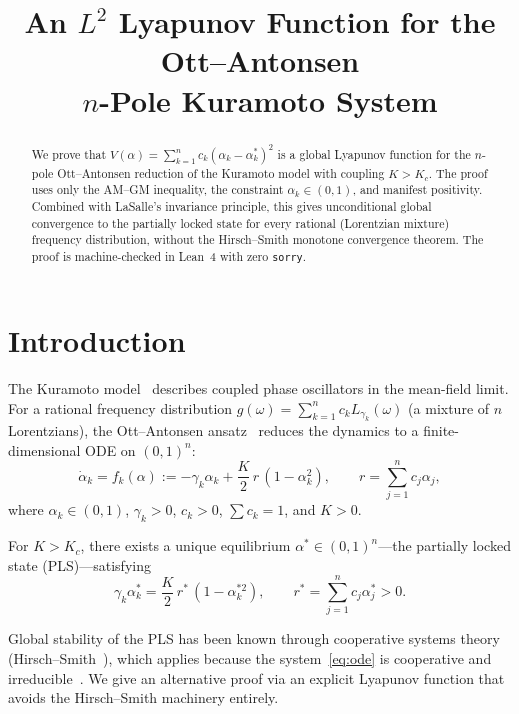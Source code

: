 \documentclass[11pt,a4paper]{article}
\title{An $L^2$ Lyapunov Function for the Ott--Antonsen\\$n$-Pole Kuramoto System}
\author{}
\date{}
\theoremstyle{definition}
\begin{document}
\maketitle

\begin{abstract}
We prove that $V(\alpha) = \sum_{k=1}^n c_k(\alpha_k - \alpha_k^*)^2$ is a global Lyapunov function for the $n$-pole Ott--Antonsen reduction of the Kuramoto model with coupling $K > K_c$. The proof uses only the AM--GM inequality, the constraint $\alpha_k \in (0,1)$, and manifest positivity. Combined with LaSalle's invariance principle, this gives unconditional global convergence to the partially locked state for every rational (Lorentzian mixture) frequency distribution, without the Hirsch--Smith monotone convergence theorem. The proof is machine-checked in Lean~4 with zero \texttt{sorry}.
\end{abstract}

\section{Introduction}

The Kuramoto model~\cite{kuramoto1975} describes coupled phase oscillators in the mean-field limit. For a rational frequency distribution $g(\omega) = \sum_{k=1}^n c_k L_{\gamma_k}(\omega)$ (a mixture of $n$ Lorentzians), the Ott--Antonsen ansatz~\cite{ott-antonsen2008} reduces the dynamics to a finite-dimensional ODE on $(0,1)^n$:
\begin{equation}\label{eq:ode}
\dot{\alpha}_k = f_k(\alpha) := -\gamma_k \alpha_k + \frac{K}{2}\,r\,(1 - \alpha_k^2), \qquad r = \sum_{j=1}^n c_j \alpha_j,
\end{equation}
where $\alpha_k \in (0,1)$, $\gamma_k > 0$, $c_k > 0$, $\sum c_k = 1$, and $K > 0$.

For $K > K_c$, there exists a unique equilibrium $\alpha^* \in (0,1)^n$---the partially locked state (PLS)---satisfying
\begin{equation}\label{eq:equil}
\gamma_k \alpha_k^* = \frac{K}{2}\,r^*\,(1 - \alpha_k^{*2}), \qquad r^* = \sum_{j=1}^n c_j \alpha_j^* > 0.
\end{equation}

Global stability of the PLS has been known through cooperative systems theory (Hirsch--Smith~\cite{hirsch1985,smith1995}), which applies because the system~\eqref{eq:ode} is cooperative and irreducible~\cite{dietert-fernandez2018}. We give an alternative proof via an explicit Lyapunov function that avoids the Hirsch--Smith machinery entirely.
\end{document}
